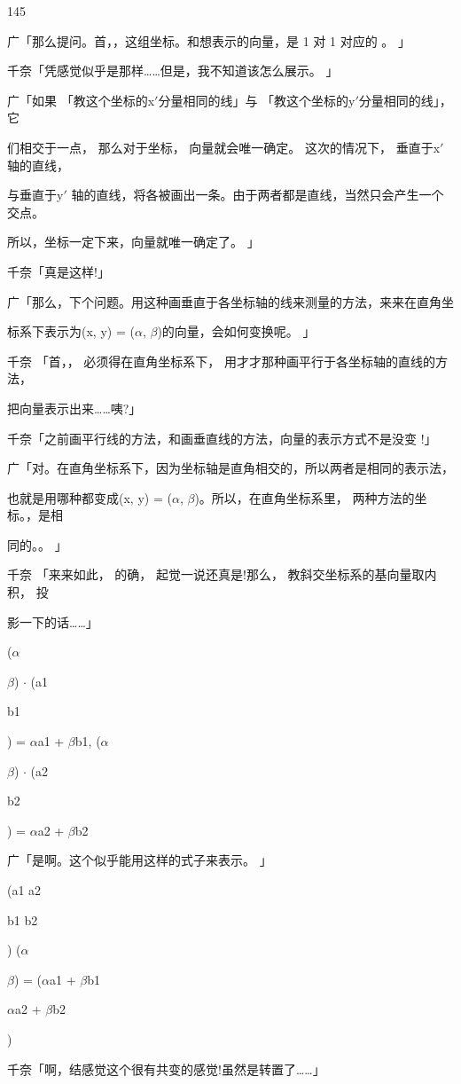 145\par
广「那么提问。首，，这组坐标。和想表示的向量，是 1 对 1 对应的 。 」\par
千奈「凭感觉似乎是那样……但是，我不知道该怎么展示。 」\par
广「如果 「教这个坐标的x$\prime$分量相同的线」与 「教这个坐标的y$\prime$分量相同的线」，它\par
们相交于一点， 那么对于坐标， 向量就会唯一确定。 这次的情况下， 垂直于x$\prime$轴的直线，\par
与垂直于y$\prime$ 轴的直线，将各被画出一条。由于两者都是直线，当然只会产生一个交点。\par
所以，坐标一定下来，向量就唯一确定了。 」\par
千奈「真是这样!」\par
广「那么，下个问题。用这种画垂直于各坐标轴的线来测量的方法，来来在直角坐\par
标系下表示为(x, y) = ($\alpha$, $\beta$)的向量，会如何变换呢。 」\par
千奈 「首，， 必须得在直角坐标系下， 用才才那种画平行于各坐标轴的直线的方法，\par
把向量表示出来……咦?」\par
千奈「之前画平行线的方法，和画垂直线的方法，向量的表示方式不是没变 !」\par
广「对。在直角坐标系下，因为坐标轴是直角相交的，所以两者是相同的表示法，\par
也就是用哪种都变成(x, y) = ($\alpha$, $\beta$)。所以，在直角坐标系里， 两种方法的坐标。，是相\par
同的。。 」\par
千奈 「来来如此， 的确， 起觉一说还真是!那么， 教斜交坐标系的基向量取内积， 投\par
影一下的话……」\par
($\alpha$\par
$\beta$) $\cdot$ (a1\par
b1\par
) = $\alpha$a1 + $\beta$b1, ($\alpha$\par
$\beta$) $\cdot$ (a2\par
b2\par
) = $\alpha$a2 + $\beta$b2\par
广「是啊。这个似乎能用这样的式子来表示。 」\par
(a1 a2\par
b1 b2\par
) ($\alpha$\par
$\beta$) = ($\alpha$a1 + $\beta$b1\par
$\alpha$a2 + $\beta$b2\par
)\par
千奈「啊，结感觉这个很有共变的感觉!虽然是转置了……」\par

